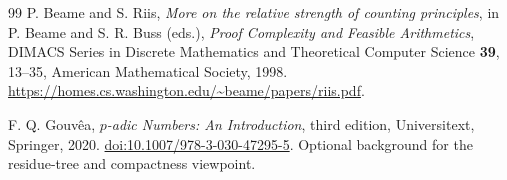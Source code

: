 \documentclass[11pt,a4paper,oneside,openany]{book}
\theoremstyle{definition}\newtheorem{definition}[theorem]{Definition}
\theoremstyle{remark}\newtheorem{remark}[theorem]{Remark}
\numberwithin{equation}{chapter}
\begin{document}
\begin{thebibliography}{99}
P. Beame and S. Riis, \emph{More on the relative strength of counting
principles}, in P. Beame and S. R. Buss (eds.), \emph{Proof Complexity
and Feasible Arithmetics}, DIMACS Series in Discrete Mathematics and
Theoretical Computer Science \textbf{39}, 13--35,
American Mathematical Society, 1998.
\url{https://homes.cs.washington.edu/~beame/papers/riis.pdf}.

F. Q. Gouv\^ea, \emph{$p$-adic Numbers: An Introduction}, third edition,
Universitext, Springer, 2020.
\href{https://doi.org/10.1007/978-3-030-47295-5}{doi:10.1007/978-3-030-47295-5}.
Optional background for the residue-tree and compactness viewpoint.

\end{thebibliography}
\end{document}
